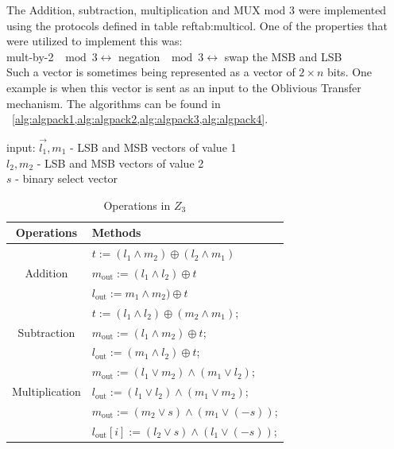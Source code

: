 The Addition, subtraction, multiplication and MUX mod 3 were implemented using the protocols defined in table ref{tab:multicol}. One of the properties that were utilized to implement this was:\\
mult-by-2 $\mod 3  \leftrightarrow$ negation $ \mod 3 \leftrightarrow$ swap the MSB and LSB \\
 
Such a vector is sometimes being represented as a vector of $2 \times n$ bits. One example is when this vector is sent as an input to the Oblivious Transfer mechanism. 
The algorithms can be found in ~\cref{alg:algpack1,alg:algpack2,alg:algpack3,alg:algpack4}.


input:   $\vec{l_1}, {m_1}$ - LSB and MSB vectors of value 1  \\
					${l_2}, {m_2}$ - LSB and MSB vectors of value 2 \\
					${s}$ - binary select vector

\begin{table}[ht]
\caption{Operations in $Z_3$}
\begin{center}
\begin{tabular}{|c|l|}
    \hline
    \textbf{Operations} & \textbf{Methods}\\
    \hline
    \multirow{3}{*}{Addition} & ${t} := ({l_1 \wedge m_2}) \oplus ({l_2 \wedge m_1})$\\
    & $m_{\mathrm{out}} := ( l_1 \wedge  l_2 ) \oplus  t $ \\
    & $l_{\mathrm{out}} :=m_1 \wedge m_2 ) \oplus t $ \\
    \hline
    \multirow{3}{*}{Subtraction} & ${t} := ({l_1} \wedge {l_2}) \oplus ({m_2} \wedge {m_1})$;\\
    & $m_{\mathrm{out}} := (l_1 \wedge m_2 ) \oplus t$;\\
    & $l_{\mathrm{out}} := (m_1 \wedge l_2 ) \oplus t$; \\
    \hline
\multirow{3}{*}{Multiplication} & $m_{\mathrm{out}}:= (l_1 \vee m_2) \wedge   (m_1 \vee l_2)$; \\
    & $l_{\mathrm{out}} := (l_1 \vee l_2) \wedge     (m_1 \vee m_2)$;\\
    \hline
\multirow{3}{*}{MUX} & $m_{\mathrm{out}} :=( m_2 \vee s) \wedge (m_1 \vee (- s) )$; \\
    & $l_{\mathrm{out}}[i] :=( l_2 \vee s) \wedge (l_1 \vee (- s) )$; \\
    \hline

\end{tabular}
\end{center}
\label{tab:multicol}
\end{table}

